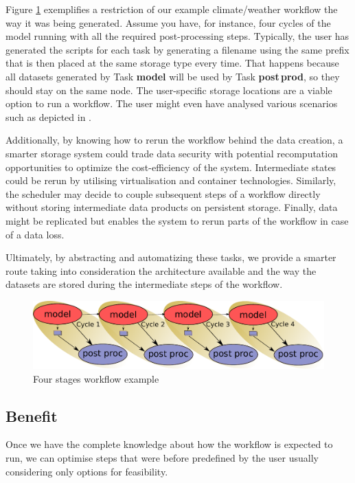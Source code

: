 \documentclass[a4paper]{article}
\begin{document}
Figure \ref{fig:cycle-4} exemplifies a restriction of our example climate/weather workflow the way it was being generated.
Assume you have, for instance, four cycles of the model running with all the required post-processing steps.
Typically, the user has generated the scripts for each task by generating a filename using the same prefix that is then placed at the same storage type every time.
That happens because all datasets generated by Task \textbf{model} will be used by Task \textbf{post\,prod}, so they should stay on the same node.
The user-specific storage locations are a viable option to run a workflow.
The user might even have analysed various scenarios such as depicted in
.


Additionally, by knowing how to rerun the workflow behind the data creation, a smarter storage system could trade data security with potential recomputation opportunities to optimize the cost-efficiency of the system.
Intermediate states could be rerun by utilising virtualisation and container technologies.
Similarly, the scheduler may decide to couple subsequent steps of a workflow directly without storing intermediate data products on persistent storage.
Finally, data might be replicated but enables the system to rerun parts of the workflow in case of a data loss.

Ultimately, by abstracting and automatizing these tasks, we provide a smarter route taking into consideration the architecture available and the way the datasets are stored during the intermediate steps of the workflow.


\begin{figure}[H]
  \centering
  \includegraphics[width=0.8\columnwidth]{cycle-4}
  \caption{Four stages workflow example}
  \label{fig:cycle-4}
\end{figure}


\subsection{Benefit}

Once we have the complete knowledge about how the workflow is expected to run, we can optimise steps that were before predefined by the user usually considering only options for feasibility.
\end{document}
